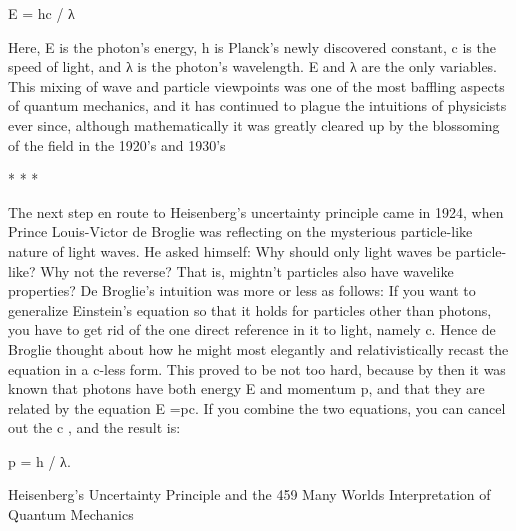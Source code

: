                        E = hc / λ

Here, E is the photon's energy, h is Planck's newly discovered constant, c is the speed
of light, and λ is the photon's wavelength. E and λ are the only variables. This mixing
of wave and particle viewpoints was one of the most baffling aspects of quantum
mechanics, and it has continued to plague the intuitions of physicists ever since,
although mathematically it was greatly cleared up by the blossoming of the field in
the 1920's and 1930's

                                           *   *   *

        The next step en route to Heisenberg's uncertainty principle came in 1924,
when Prince Louis-Victor de Broglie was reflecting on the mysterious particle-like
nature of light waves. He asked himself: Why should only light waves be particle-
like? Why not the reverse? That is, mightn't particles also have wavelike properties?
De Broglie's intuition was more or less as follows: If you want to generalize Einstein's
equation so that it holds for particles other than photons, you have to get rid of the one
direct reference in it to light, namely c. Hence de Broglie thought about how he might
most elegantly and relativistically recast the equation in a c-less form.
        This proved to be not too hard, because by then it was known that photons
have both energy E and momentum p, and that they are related by the equation E =pc.
If you combine the two equations, you can cancel out the c , and the result is:

                              p = h / λ.




Heisenberg's Uncertainty Principle and the                                            459
Many Worlds Interpretation of Quantum Mechanics

